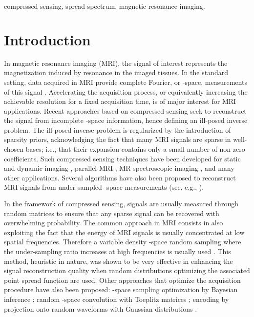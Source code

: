 \documentclass[10pt,draftcls, onecolumn]{IEEEtran}
\begin{document}
\begin{IEEEkeywords}
compressed sensing, spread spectrum, magnetic resonance imaging.
\end{IEEEkeywords}

\section{Introduction}

In magnetic resonance imaging (MRI), the signal of interest  represents the magnetization induced by resonance in the imaged tissues. In the standard setting, data acquired in MRI provide complete Fourier, or -space, measurements of this signal . Accelerating the acquisition process, or equivalently increasing the achievable resolution for a fixed acquisition time, is of major interest for MRI applications. Recent approaches based on compressed sensing seek to reconstruct the signal from incomplete -space information, hence defining an ill-posed inverse problem. The ill-posed inverse problem is regularized by the introduction of sparsity priors, acknowledging the fact that many MRI signals are sparse in well-chosen bases; i.e., that their expansion contains only a small number of non-zero coefficients. Such compressed sensing techniques have been developed for static and dynamic imaging \cite{lustig07, jung07, gamper08, jung09, usman11}, parallel MRI \cite{liang09a, lustig10, otazo10}, MR spectroscopic imaging \cite{hu08, hu10, larson10}, and many other applications. Several algorithms have also been proposed to reconstruct MRI signals from under-sampled -space measurements (see, e.g., \cite{kim07, trzasko09, kern11}).

In the framework of compressed sensing, signals are usually measured through random matrices to ensure that any sparse signal can be recovered with overwhelming probability. The common approach in MRI consists in also exploiting the fact that the energy of MRI signals is usually concentrated at low spatial frequencies. Therefore a variable density -space random sampling where the under-sampling ratio increases at high frequencies is usually used \cite{lustig07}. This method, heuristic in nature, was shown to be very effective in enhancing the signal reconstruction quality when random distributions optimizing the associated point spread function are used. Other approaches that optimize the acquisition procedure have also been proposed: -space sampling optimization by Bayesian inference \cite{seeger10}; random -space convolution with Toeplitz matrices \cite{sebert08, liang09b, wang09}; encoding by projection onto random waveforms with Gaussian distributions \cite{haldar10}.
\end{document}
